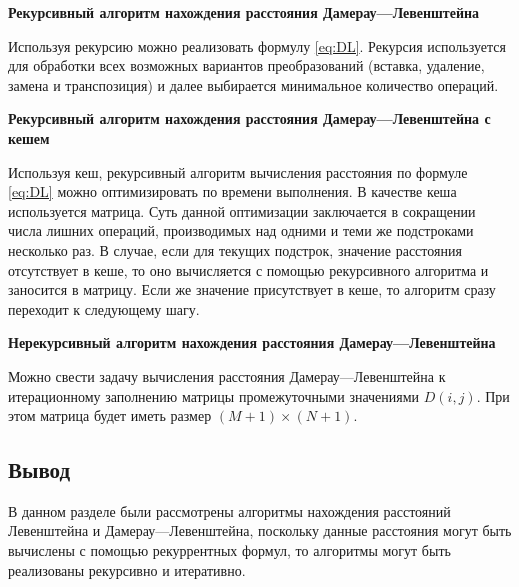 \newpage

\textbf{Рекурсивный алгоритм нахождения расстояния Дамерау---Левенштейна}

Используя рекурсию можно реализовать формулу \eqref{eq:DL}.
Рекурсия используется для обработки всех возможных вариантов преобразований (вставка, удаление, замена и транспозиция) и далее выбирается минимальное количество операций.

\textbf{Рекурсивный алгоритм нахождения расстояния Дамерау---Левенштейна с кешем}

Используя кеш, рекурсивный алгоритм вычисления расстояния по формуле \eqref{eq:DL} можно оптимизировать по времени выполнения. В качестве кеша используется матрица.
Суть данной оптимизации заключается в сокращении числа лишних операций, производимых над одними и теми же подстроками несколько раз.
В случае, если для текущих подстрок, значение расстояния отсутствует в кеше, то оно вычисляется с помощью рекурсивного алгоритма и заносится в матрицу. 
Если же значение присутствует в кеше, то алгоритм сразу переходит к следующему шагу.

\textbf{Нерекурсивный алгоритм нахождения расстояния Дамерау---Левенштейна}

Можно свести задачу вычисления расстояния Дамерау---Левенштейна к итерационному заполнению матрицы промежуточными значениями $D(i, j)$.
При этом матрица будет иметь размер $(M+1) \times (N+1)$.

\subsection*{Вывод}
В данном разделе были рассмотрены алгоритмы нахождения расстояний Левенштейна и Дамерау---Левенштейна, поскольку данные расстояния могут быть вычислены с помощью рекуррентных формул, то алгоритмы могут быть реализованы рекурсивно и итеративно. 



